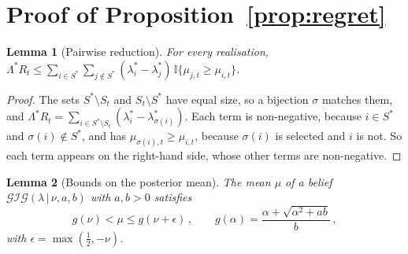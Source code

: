 \documentclass[twoside]{article}
\newcommand\given[1][]{\,#1\vert\,}
\providecommand{\Gig}{\mathcal{GIG}}  %
\theoremstyle{plain}
\newtheorem{lemma}{Lemma}
\theoremstyle{definition}
\theoremstyle{remark}
\begin{document}
\section{Proof of Proposition~\ref{prop:regret}}
\label{appx:regret}

\begin{lemma}[Pairwise reduction]
    \label{lem:pairwise}
    For every realisation, $\Lambda^{*} R_t \leq \sum_{i \in S^{*}} \sum_{j \notin S^{*}} (\lambda^{*}_i - \lambda^{*}_j) \, \mathbb{I}\{\mu_{j,t} \geq \mu_{i,t}\}$.
\end{lemma}

\begin{proof}
    The sets $S^{*} \setminus S_t$ and $S_t \setminus S^{*}$ have equal size, so a bijection $\sigma$ matches them, and $\Lambda^{*} R_t = \sum_{i \in S^{*} \setminus S_t} (\lambda^{*}_i - \lambda^{*}_{\sigma(i)})$.
    Each term is non-negative, because $i \in S^{*}$ and $\sigma(i) \notin S^{*}$, and has $\mu_{\sigma(i),t} \geq \mu_{i,t}$, because $\sigma(i)$ is selected and $i$ is not.
    So each term appears on the right-hand side, whose other terms are non-negative.
\end{proof}

\begin{lemma}[Bounds on the posterior mean]
    \label{lem:mean_bounds}
    The mean $\mu$ of a belief $\Gig(\lambda \given \nu, a, b)$ with $a, b > 0$ satisfies
    \begin{equation}
        g(\nu) < \mu \leq g(\nu + \epsilon) \,, \qquad g(\alpha) = \frac{\alpha + \sqrt{\alpha^{2} + ab}}{b} \,,
        \label{eq:mean_bounds}
    \end{equation}
    with $\epsilon = \max(\tfrac{1}{2}, -\nu)$.
\end{lemma}
\end{document}
